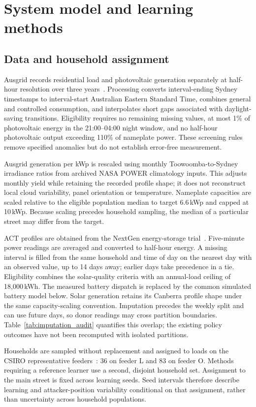 \section{System model and learning methods}
\label{sec:methods}
\subsection{Data and household assignment}
Ausgrid records residential load and photovoltaic generation separately at half-hour resolution over three years~\cite{ausgrid}. Processing converts interval-ending Sydney timestamps to interval-start Australian Eastern Standard Time, combines general and controlled consumption, and interpolates short gaps associated with daylight-saving transitions. Eligibility requires no remaining missing values, at most 1\% of photovoltaic energy in the 21:00--04:00 night window, and no half-hour photovoltaic output exceeding 110\% of nameplate power. These screening rules remove specified anomalies but do not establish error-free measurement.

Ausgrid generation per kWp is rescaled using monthly Toowoomba-to-Sydney irradiance ratios from archived NASA POWER climatology inputs. This adjusts monthly yield while retaining the recorded profile shape; it does not reconstruct local cloud variability, panel orientation or temperature. Nameplate capacities are scaled relative to the eligible population median to target 6.6\,kWp and capped at 10\,kWp. Because scaling precedes household sampling, the median of a particular street may differ from the target.

ACT profiles are obtained from the NextGen energy-storage trial~\cite{nextgen}. Five-minute power readings are averaged and converted to half-hour energy. A missing interval is filled from the same household and time of day on the nearest day with an observed value, up to 14 days away; earlier days take precedence in a tie. Eligibility combines the solar-quality criteria with an annual-load ceiling of 18,000\,kWh. The measured battery dispatch is replaced by the common simulated battery model below. Solar generation retains its Canberra profile shape under the same capacity-scaling convention. Imputation precedes the weekly split and can use future days, so donor readings may cross partition boundaries. Table~\ref{tab:imputation_audit} quantifies this overlap; the existing policy outcomes have not been recomputed with isolated partitions.

Households are sampled without replacement and assigned to loads on the CSIRO representative feeders~\cite{csiro}: 36 on feeder L and 83 on feeder O. Methods requiring a reference learner use a second, disjoint household set. Assignment to the main street is fixed across learning seeds. Seed intervals therefore describe learning and attacker-position variability conditional on that assignment, rather than uncertainty across household populations.

